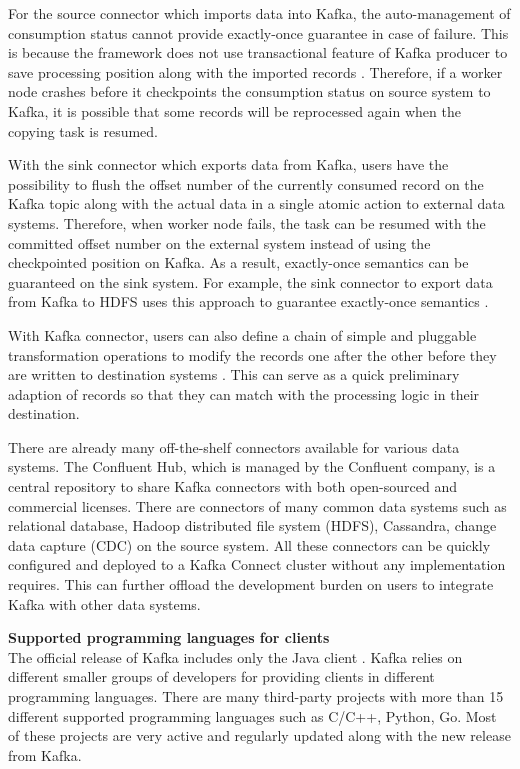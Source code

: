 For the source connector which imports data into Kafka, the auto-management of consumption status cannot provide exactly-once guarantee in case of failure. This is because the framework does not use transactional feature of Kafka producer to save processing position along with the imported records \cite{kafkaconnectsource}. Therefore, if a worker node crashes before it checkpoints the consumption status on source system to Kafka, it is possible that some records will be reprocessed again when the copying task is resumed. 

With the sink connector which exports data from Kafka, users have the possibility to flush the offset number of the currently consumed record on the Kafka topic along with the actual data in a single atomic action to external data systems. Therefore, when worker node fails, the task can be resumed with the committed offset number on the external system instead of using the checkpointed position on Kafka. As a result, exactly-once semantics can be guaranteed on the sink system. For example, the sink connector to export data from Kafka to HDFS uses this approach to guarantee exactly-once semantics \cite{kafkahdfsconnector}.


With Kafka connector, users can also define a chain of simple and pluggable transformation operations to modify the records one after the other before they are written to destination systems \cite{kafkaconnect}. This can serve as a quick preliminary adaption of records so that they can match with the processing logic in their destination.

There are already many off-the-shelf connectors available for various data systems. The Confluent Hub, which is managed by the Confluent company, is a central repository to share Kafka connectors with both open-sourced and commercial licenses. There are connectors of many common data systems such as relational database, Hadoop distributed file system (HDFS), Cassandra, change data capture (CDC) on the source system. All these connectors can be quickly configured and deployed to a Kafka Connect cluster without any implementation requires. This can further offload the development burden on users to integrate Kafka with other data systems.



\textbf{Supported programming languages for clients}\\
The official release of Kafka includes only the Java client \cite{kafkaclients}. Kafka relies on different smaller groups of developers for providing clients in different programming languages. There are many third-party projects with more than 15 different supported programming languages such as C/C++, Python, Go. Most of these projects are very active and regularly updated along with the new release from Kafka.  


